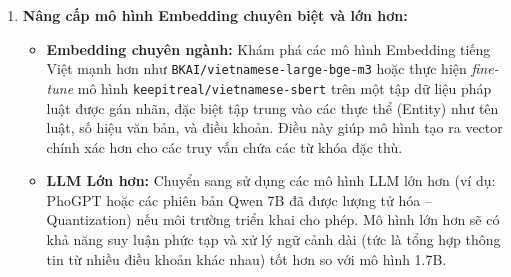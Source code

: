\begin{enumerate}
    \item \textbf{Nâng cấp mô hình Embedding chuyên biệt và lớn hơn:}

    \begin{itemize}
        \item \textbf{Embedding chuyên ngành:} Khám phá các mô hình Embedding tiếng Việt mạnh hơn
        như \texttt{BKAI/vietnamese-large-bge-m3} hoặc thực hiện \textit{fine-tune} mô hình
        \texttt{keepitreal/vietnamese-sbert} trên một tập dữ liệu pháp luật được gán nhãn, đặc
        biệt tập trung vào các thực thể (Entity) như tên luật, số hiệu văn bản, và điều khoản.
        Điều này giúp mô hình tạo ra vector chính xác hơn cho các truy vấn chứa các từ khóa
        đặc thù.

        \item \textbf{LLM Lớn hơn:} Chuyển sang sử dụng các mô hình LLM lớn hơn (ví dụ: PhoGPT hoặc
        các phiên bản Qwen 7B đã được lượng tử hóa -- Quantization) nếu môi trường triển
        khai cho phép. Mô hình lớn hơn sẽ có khả năng suy luận phức tạp và xử lý ngữ cảnh
        dài (tức là tổng hợp thông tin từ nhiều điều khoản khác nhau) tốt hơn so với mô
        hình 1.7B.
    \end{itemize}
\end{enumerate}